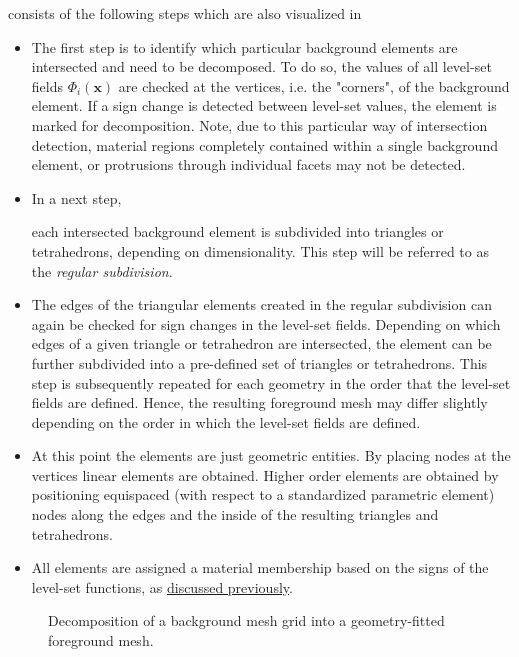 consists of the following steps which are also visualized in 
\begin{itemize}
    \item The first step is to identify which particular background elements are intersected and need to be decomposed. To do so, the values of all level-set fields $\Phi_i(\bm{x})$ are checked at the vertices, i.e. the "corners", of the background element. If a sign change is detected between level-set values, the element is marked for decomposition. Note, due to this particular way of intersection detection, material regions completely contained within a single background element, or protrusions through individual facets may not be detected.

    \item \hypertarget{regular_subdivision}{In a next step,} each intersected background element is subdivided into triangles or tetrahedrons, depending on dimensionality. This step will be referred to as the \emph{regular subdivision}.

    \item The edges of the triangular elements created in the regular subdivision can again be checked for sign changes in the level-set fields. Depending on which edges of a given triangle or tetrahedron are intersected, the element can be further subdivided into a pre-defined set of triangles or tetrahedrons.
    This step is subsequently repeated for each geometry in the order that the level-set fields are defined. Hence, the resulting foreground mesh may differ slightly depending on the order in which the level-set fields are defined.
    
    \item At this point the elements are just geometric entities. By placing nodes at the vertices linear elements are obtained. Higher order elements are obtained by positioning equispaced (with respect to a standardized parametric element) nodes along the edges and the inside of the resulting triangles and tetrahedrons.
    
    \item All elements are assigned a material membership based on the signs of the level-set functions, as \hyperlink{phase_assignment}{discussed previously}.
\end{itemize}

\begin{figure}[h]
    \vspace{0.2cm}
    \begin{center}
    
    \caption{Decomposition of a background mesh grid into a geometry-fitted foreground mesh.} 
    \label{fig:decomposition}
    \end{center}
\end{figure}

